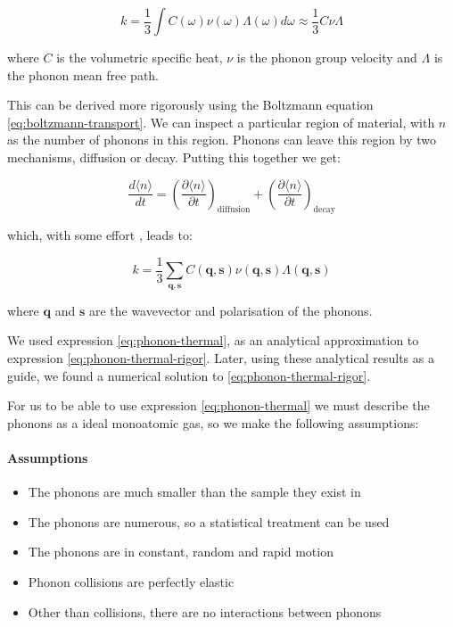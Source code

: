 \documentclass[12pt]{article}
\renewcommand{\vec}[1]{\mathbf{#1}}
\begin{document}
\begin{equation}
\label{eq:phonon-thermal}
	k = \frac{1}{3} \int C(\omega) \nu(\omega) \Lambda (\omega) d\omega \approx \frac{1}{3}C\nu\Lambda
\end{equation}

where $C$ is the volumetric specific heat, $\nu$ is the phonon group velocity and $\Lambda$ is the phonon mean free path.

This can be derived more rigorously using the Boltzmann equation \eqref{eq:boltzmann-transport}. We can inspect a particular region of material, with $n$ as the number of phonons in this region. Phonons can leave this region by two mechanisms, diffusion or decay. Putting this together we get:

\begin{equation}
\label{eq:boltz-phonon-thermal}
	\frac{d \langle n \rangle}{dt} = \left(\frac{\partial \langle n \rangle}{\partial t}\right)_\mathrm{diffusion} + \left(\frac{\partial \langle n \rangle}{\partial t}\right)_\mathrm{decay}
\end{equation}

which, with some effort \cite{gp}, leads to:

\begin{equation}
\label{eq:phonon-thermal-rigor}
	k = \frac{1}{3} \sum_{\vec{q}, \vec{s}} C (\vec{q}, \vec{s}) \nu (\vec{q}, \vec{s}) \Lambda (\vec{q}, \vec{s})
\end{equation}

where $\vec{q}$ and $\vec{s}$ are the wavevector and polarisation of the phonons.

We used expression \eqref{eq:phonon-thermal}, as an analytical approximation to expression \eqref{eq:phonon-thermal-rigor}. Later, using these analytical results as a guide, we found a numerical solution to \eqref{eq:phonon-thermal-rigor}.

For us to be able to use expression \eqref{eq:phonon-thermal} we must describe the phonons as a ideal monoatomic gas, so we make the following assumptions:
\paragraph{Assumptions}
\begin{itemize}
  \item The phonons are much smaller than the sample they exist in
  \item The phonons are numerous, so a statistical treatment can be used
  \item The phonons are in constant, random and rapid motion
  \item Phonon collisions are perfectly elastic
  \item Other than collisions, there are no interactions between phonons
\end{itemize}
\end{document}
